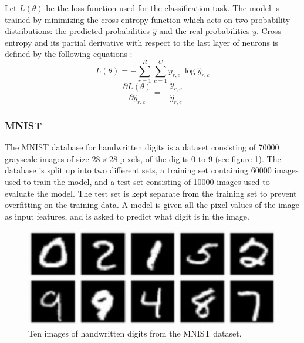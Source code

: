 \documentclass[a4paper, twoside]{article}
\newcommand*{\pd}[2]{\ensuremath{\dfrac{\partial #1}{\partial #2}}}
\begin{document}
Let $L(\theta)$ be the loss function used for the classification task. The model is trained by minimizing the cross entropy function which acts on two probability distributions: the predicted probabilities $\hat{y}$ and the real probabilities $y$. Cross entropy and its partial derivative with respect to the last layer of neurons is defined by the following equations \cite{notesonbackprop}: 
\begin{equation}\label{crossentropy}
L(\theta) = - \sum^{R }_{r=1} \sum^{C }_{c=1}y_{r,c} \ \log{\hat{y}_{r,c}}
\end{equation}
\begin{equation}\label{dydxcrossentropy}
\pd{L(\theta)}{\hat{y}_{r,c}} = - \frac{y_{r,c}}{\hat{y}_{r,c}}
\end{equation}

\subsubsection{MNIST}
The MNIST database for handwritten digits \cite{MNIST} is a dataset consisting of 70000 grayscale images of size $28 \times 28$ pixels, of the digits 0 to 9 (see figure \ref{figMNIST}). The database is split up into two different sets, a training set containing 60000 images used to train the model, and a test set consisting of 10000 images used to evaluate the model. The test set is kept separate from the training set to prevent overfitting on the training data. A model is given all the pixel values of the image as input features, and is asked to predict what digit is in the image.

\begin{figure}[h]
	\centering
  		\includegraphics[scale=1]{mnist.png}
  	\caption{Ten images of handwritten digits from the MNIST dataset. \cite{MNIST}} \label{figMNIST}
\end{figure}
\end{document}

